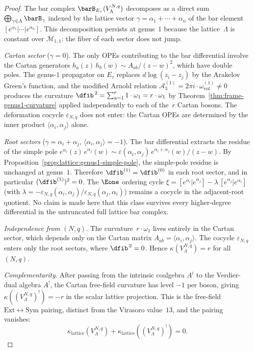 \begin{proof}
The bar complex $\barB_{E_\tau}(V_\Lambda^{N,q})$ decomposes as a
direct sum $\bigoplus_{\gamma \in \Lambda} \barB_\gamma$ indexed by
the lattice vector $\gamma = \alpha_1 + \cdots + \alpha_n$ of the
bar element $[e^{\alpha_1} | \cdots | e^{\alpha_n}]$. This
decomposition persists at genus~$1$ because the lattice~$\Lambda$ is
constant over $\overline{\mathcal{M}}_{1,1}$: the fiber of each sector
does not jump.

\emph{Cartan sector} ($\gamma = 0$).
The only OPEs contributing to the bar differential involve the Cartan
generators $h_a(z)\,h_b(w) \sim A_{ab}/(z-w)^2$, which have double
poles. The genus-$1$ propagator on $E_\tau$ replaces
$d\log(z_i - z_j)$ by the Arakelov Green's function, and the modified
Arnold relation $\mathcal{A}_3^{(1)} = 2\pi i \cdot
\omega_{\mathrm{vol}}^{(1)} \neq 0$
produces the curvature $\dfib^{\,2} = \sum_{a=1}^r 1 \cdot \omega_1
= r \cdot \omega_1$ by
Theorem~\ref{thm:frame-genus1-curvature} applied independently to
each of the~$r$ Cartan bosons. The deformation cocycle
$\varepsilon_{N,q}$ does not enter: the Cartan OPEs are determined by
the inner product $\langle \alpha_i, \alpha_j \rangle$ alone.

\emph{Root sectors}
($\gamma = \alpha_i + \alpha_j$, $\langle\alpha_i,\alpha_j\rangle = -1$).
The bar differential extracts the residue of the simple pole
$e^{\alpha_i}(z)\,e^{\alpha_j}(w) \sim
\varepsilon(\alpha_i,\alpha_j)\,e^{\alpha_i+\alpha_j}(w)/(z-w)$.
By Proposition~\ref{prop:lattice:genus1-simple-pole}, the simple-pole
residue is unchanged at genus~$1$. Therefore
$\dfib^{(1)} = \dfib^{(0)}$ in each root sector, and in particular
$(\dfib^{(1)})^2 = 0$. The $\Eone$ ordering cycle
$\xi = [e^{\alpha_i}|e^{\alpha_j}]
- \lambda\,[e^{\alpha_j}|e^{\alpha_i}]$
(with
$\lambda = -\varepsilon_{N,q}(\alpha_i,\alpha_j) /
\varepsilon_{N,q}(\alpha_j,\alpha_i)$)
remains a cocycle in the adjacent-root quotient. No claim is made here
that this class survives every higher-degree differential in the
untruncated full lattice bar complex.

\emph{Independence from $(N,q)$}.
The curvature~$r \cdot \omega_1$ lives entirely in the Cartan sector,
which depends only on the Cartan matrix $A_{ab} = \langle\alpha_i,
\alpha_j\rangle$. The cocycle $\varepsilon_{N,q}$ enters only the
root sectors, where $\dfib^{\,2} = 0$. Hence
$\kappa(V_\Lambda^{N,q}) = r$ for all $(N,q)$.

\emph{Complementarity}.
After passing from the intrinsic coalgebra $A^i$ to the Verdier-dual
algebra $A^!$, the Cartan free-field curvature has level $-1$ per
boson, giving $\kappa((V_\Lambda^{N,q})^!) = -r$ in the scalar lattice
projection. This is the free-field
$\mathrm{Ext}\leftrightarrow\mathrm{Sym}$ pairing, distinct from the
Virasoro value~$13$, and the pairing vanishes:
\[
\kappa_{\mathrm{lattice}}(V_\Lambda^{N,q}) +
\kappa_{\mathrm{lattice}}((V_\Lambda^{N,q})^!) = 0.
\]
\end{proof}

